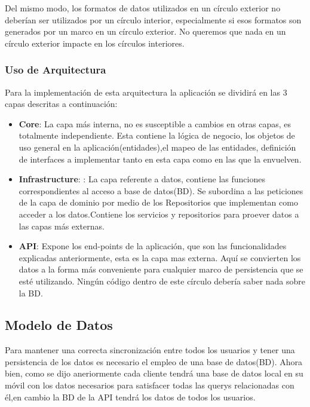Del mismo modo, los formatos de datos utilizados en un círculo exterior no deberían ser utilizados por un círculo interior, especialmente si esos formatos son generados por un marco en un círculo exterior. No queremos que nada en un círculo exterior impacte en los círculos interiores. 



\subsubsection{Uso de Arquitectura}
Para la implementación de esta arquitectura la aplicación se dividirá en las 3 capas descritas a continuación:

\begin{itemize}
	\item \textbf{Core}: La capa más interna, no es susceptible a cambios en otras capas, es totalmente independiente. Esta contiene la lógica de negocio, los objetos de uso general en la aplicación(entidades),el mapeo de las entidades, definición de interfaces a implementar tanto en esta capa como en las que la envuelven.
	
	\item \textbf{Infrastructure}: : La capa referente a datos, contiene las funciones correspondientes al acceso a base de datos(BD). Se subordina a las peticiones de la capa de dominio por medio de los
	Repositorios que implementan como acceder a los datos.Contiene los servicios y repositorios para proever datos a las capas más externas.
	
	\item \textbf{API}: Expone los end-points de la aplicación, que son las funcionalidades explicadas anteriormente, esta es la capa mas externa. Aquí se convierten los datos  a la forma más conveniente para cualquier marco de persistencia que se esté utilizando. Ningún código dentro de este círculo debería saber nada sobre la BD.
	
\end{itemize}


\subsection{Modelo de Datos }

Para mantener una correcta sincronización entre todos los usuarios y tener una persistencia de  los datos es necesario el empleo de una base de datos(BD). Ahora bien, como se dijo aneriormente cada cliente tendrá una base de datos local en su móvil con los datos necesarios para satisfacer todas las querys relacionadas con él,en cambio la BD de la API tendrá los datos de todos los usuarios. 

